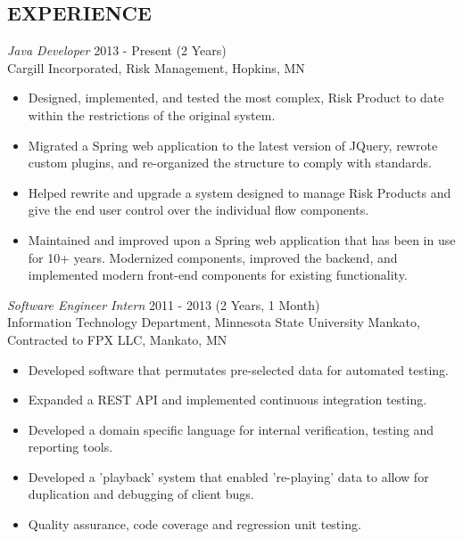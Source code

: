 \documentclass[line,margin]{res}
\begin{document}
\begin{resume}
\section{EXPERIENCE} {\sl Java Developer} \hfill 2013 - Present (2 Years) \\
                Cargill Incorporated,
                Risk Management, Hopkins, MN 
                \begin{itemize}  \itemsep -2pt %
                \item Designed, implemented, and tested the most complex, 
                    Risk Product to date within the restrictions of the original 
                    system.
                \item Migrated a Spring web application to the latest version 
                    of JQuery, rewrote custom plugins, and re-organized the 
                    structure to comply with standards.
                \item Helped rewrite and upgrade a system designed to manage 
                    Risk Products and give the end user control over the
		    individual flow components.
                \item Maintained and improved upon a Spring web application 
                    that has been in use for 10+ years. Modernized components, 
                    improved the backend, and implemented modern front-end 
                    components for existing functionality. 
                \end{itemize}
 
                {\sl Software Engineer Intern} \hfill            2011 - 2013 (2 Years, 1 Month) \\
                Information Technology Department, Minnesota State University Mankato, \\
                Contracted to FPX LLC, Mankato, MN 
                \begin{itemize}  \itemsep -2pt %
                \item Developed software that permutates pre-selected data for 
                    automated testing. 
                \item Expanded a REST API and implemented continuous 
                    integration testing. 
                \item Developed a domain specific language for internal 
                     verification, testing and reporting tools. 
                \item Developed a 'playback' system that enabled 're-playing' 
                    data to allow for duplication and debugging of client bugs. 
                \item Quality assurance, code coverage and regression unit testing. 
                \end{itemize} 


\end{resume}
\end{document}
